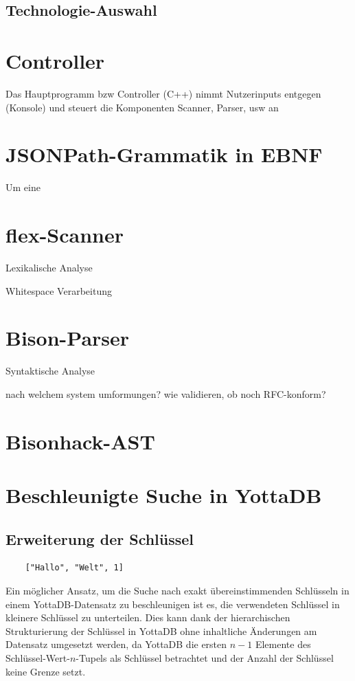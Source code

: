 \documentclass[oneside]{ausarbeitung}
\begin{document}
	
	
\subsection{Technologie-Auswahl}
	
\section{Controller}
Das Hauptprogramm bzw Controller (C++) nimmt Nutzerinputs entgegen (Konsole) und steuert die Komponenten Scanner, Parser, usw an
	
\section{JSONPath-Grammatik in EBNF}
	
Um eine 
	
\section{flex-Scanner}
Lexikalische Analyse
	
Whitespace Verarbeitung
	
\section{Bison-Parser}
Syntaktische Analyse
	
nach welchem system umformungen? 
wie validieren, ob noch RFC-konform?
	
\section{Bisonhack-AST}
	
\section{Beschleunigte Suche in YottaDB}
	
	
	
\subsection{Erweiterung der Schlüssel}
	
\begin{lstlisting}
	["Hallo", "Welt", 1]
\end{lstlisting}
	
Ein möglicher Ansatz, um die Suche nach exakt übereinstimmenden Schlüsseln in einem YottaDB-Datensatz zu beschleunigen ist es, die verwendeten Schlüssel in kleinere Schlüssel zu unterteilen. Dies kann dank der hierarchischen Strukturierung der Schlüssel in YottaDB ohne inhaltliche Änderungen am Datensatz umgesetzt werden, da YottaDB die ersten $n-1$ Elemente des Schlüssel-Wert-$n$-Tupels als Schlüssel betrachtet und der Anzahl der Schlüssel keine Grenze setzt.
	
\end{document}
